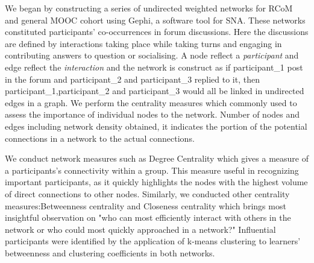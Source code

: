 \documentclass[format=acmsmall, review=false, screen=true]{acmart}
\begin{document}
We began by constructing a series of undirected weighted networks for RCoM and general MOOC cohort using Gephi, a software tool for SNA. These networks constituted participants’ co-occurrences in forum discussions. Here the discussions are defined by interactions taking place while taking turns and engaging in contributing answers to question or socialising. A node reflect a \textit{participant} and edge reflect the \textit{interaction} and the network is construct as if participant\_1 post in the forum and participant\_2 and participant\_3 replied to it, then participant\_1,participant\_2 and participant\_3 would all be linked in undirected edges in a graph. We perform the centrality measures which commonly used to assess the importance of individual nodes to the network. Number of nodes and edges including network density obtained, it indicates the portion of the potential connections in a network to the actual connections.

We conduct network measures such as Degree Centrality which gives a measure of a participants’s connectivity within a group. This measure useful in recognizing important participants, as it quickly highlights the nodes with the highest volume of direct connections to other nodes. Similarly, we conducted other centrality measures:Betweenness centrality and Closeness centrality which brings most insightful observation on "who can most efficiently interact with others in the network or who could most quickly approached in a network?" Influential participants were identified by the application of k-means clustering to learners’ betweenness and clustering coefficients in both networks. 

\end{document}
